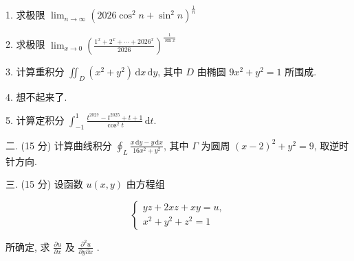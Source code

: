 \documentclass{examcollection}
\renewcommand{\displayformula}[1]{\[#1\]}
\begin{document}
{\begin{minipage}{\textwidth}
1. 求极限 $\lim_{n\to \infty}(2026\cos^2 n + \sin^2 n)^{\frac{1}{n}}$\par
2. 求极限  $\lim_{x\to0}\left(\frac{1^{x}+2^{x}+\cdots+2026^{x}}{2026}\right)^{\frac{1}{\sin x}}$\par
3. 计算重积分 $\iint_{D} (x^{2} + y^{2}) \, \mathrm{d}x \, \mathrm{d}y$, 其中 $D$ 由椭圆 $9x^{2} + y^{2} = 1$ 所围成.\par
4. 想不起来了.\par
5. 计算定积分 $\int_{-1}^{1} \frac{t^{2027} - t^{2025} + t + 1}{\cos^2 t} \, \mathrm{d}t.$\par
二. (15 分) 计算曲线积分 $\oint_{L} \frac{x \, \mathrm{d}y - y \, \mathrm{d}x}{16x^{2} + y^{2}}$, 其中 $\Gamma$ 为圆周 $(x - 2)^{2} + y^{2} = 9$, 取逆时针方向.\par
三. (15 分) 设函数 $u(x, y)$ 由方程组\par
\displayformula{\left\{ \begin{array}{l} y z + 2 x z + x y = u, \\ x ^ {2} + y ^ {2} + z ^ {2} = 1 \end{array} \right.}\par
所确定, 求  $\frac{\partial u}{\partial x}$  及  $\frac{\partial^{2}u}{\partial y\partial x}$ .\par
\end{minipage}}
\ifdim\dimexpr\ht\proofbox+\dp\proofbox\relax>\textheight
\noindent\resizebox{!}{\textheight}{\usebox{\proofbox}}\else\noindent\usebox{\proofbox}\fi\clearpage
\end{document}
